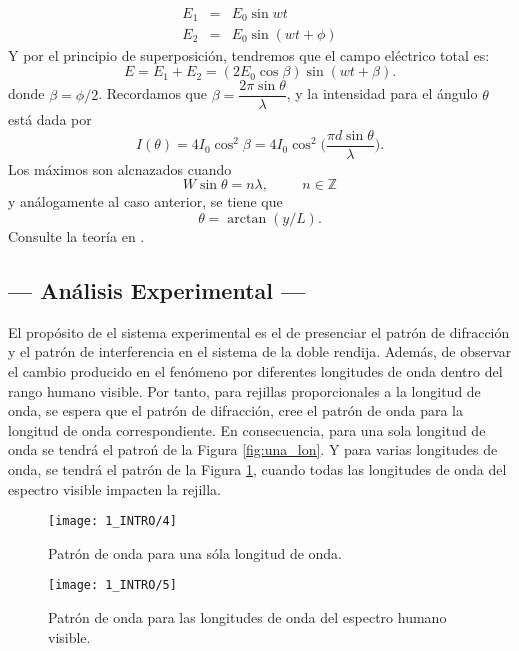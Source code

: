 \documentclass[12pt,a4paper]{article}
\begin{document}
\begin{equation}
	\begin{array}{rcl}
		E_1 & = & E_0 \sin wt \\[2mm]
		E_2 & = & E_0 \sin (wt+ \phi)
	\end{array}
	\label{eq:campos_electricos}
\end{equation}
Y por el principio de superposición, tendremos que el campo eléctrico total es:
\begin{equation}
	E = E_1 + E_2 = (2E_0 \cos \beta) \sin (wt+ \beta).
	\label{eq:campo_total}
\end{equation}
donde \(\beta = \phi /2\). Recordamos que \(\beta = \dfrac{2 \pi \sin \theta}{\lambda}\), y la intensidad para el ángulo \(\theta\) está dada por
\begin{equation}
	I(\theta) = 4I_0 \cos ^2 \beta = 4I_0 \cos ^2 \bigg(\dfrac{\pi d \sin \theta}{\lambda}\bigg).
	\label{eq:intensidad}
\end{equation}
Los máximos son alcnazados cuando
\begin{equation}
	W \sin \theta = n \lambda , \hspace{1cm} n \in \mathds{Z}
	\label{eq:maximos}
\end{equation}
y análogamente al caso anterior, se tiene que
\begin{equation}
	\theta = \arctan (y/L).
	\label{eq:theta}
\end{equation}
Consulte la teoría en .

\subsection{--- Análisis Experimental ---} %
\label{sub:analisis_experimental}
El propósito de el sistema experimental es el de presenciar el patrón de difracción y el patrón de interferencia en el sistema de la doble rendija.
Además, de observar el cambio producido en el fenómeno por diferentes longitudes de onda dentro del rango humano visible.
Por tanto, para rejillas proporcionales a la longitud de onda, se espera que el patrón de difracción, cree el patrón de onda para la longitud de onda correspondiente.
En consecuencia, para una sola longitud de onda se tendrá el patroń de la Figura \ref{fig:una_lon}. Y para varias longitudes de onda, se tendrá el patrón de la Figura \ref{fig:var_lon}, cuando todas las longitudes de onda del espectro visible impacten la rejilla.
\begin{figure}[hbtp!]
	\begin{minipage}{0.5\linewidth}
		\texttt{[image: 1\_INTRO/4]}
		\caption{Patrón de onda para una sóla longitud de onda.}
		\label{fig:una_lon}
	\end{minipage}\hspace{5mm}
	\begin{minipage}{0.5\linewidth}
		\texttt{[image: 1\_INTRO/5]}
		\caption{Patrón de onda para las longitudes de onda del espectro humano visible.}
		\label{fig:var_lon}
	\end{minipage}
\end{figure}
\end{document}
